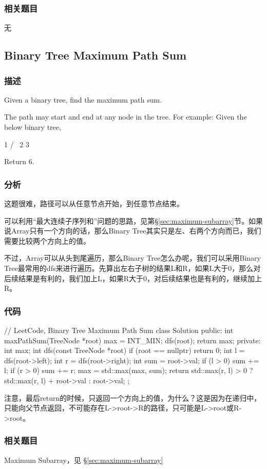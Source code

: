 \subsubsection{相关题目}
\begindot
\item 无
\myenddot


\subsection{Binary Tree Maximum Path Sum}
\label{sec:binary-tree-maximum-path-sum}


\subsubsection{描述}
Given a binary tree, find the maximum path sum.

The path may start and end at any node in the tree.
For example:
Given the below binary tree,
\begin{Code}
  1
 / \
2   3
\end{Code}
Return $6$.


\subsubsection{分析}
这题很难，路径可以从任意节点开始，到任意节点结束。

可以利用“最大连续子序列和”问题的思路，见第\S \ref{sec:maximum-subarray}节。如果说Array只有一个方向的话，那么Binary Tree其实只是左、右两个方向而已，我们需要比较两个方向上的值。

不过，Array可以从头到尾遍历，那么Binary Tree怎么办呢，我们可以采用Binary Tree最常用的dfs来进行遍历。先算出左右子树的结果L和R，如果L大于0，那么对后续结果是有利的，我们加上L，如果R大于0，对后续结果也是有利的，继续加上R。

\subsubsection{代码}

\begin{Code}
// LeetCode, Binary Tree Maximum Path Sum
class Solution {
public:
    int maxPathSum(TreeNode *root) {
        max = INT_MIN;
        dfs(root);
        return max;
    }
private:
    int max;
    int dfs(const TreeNode *root) {
        if (root == nullptr) return 0;
        int l = dfs(root->left);
        int r = dfs(root->right);
        int sum = root->val;
        if (l > 0) sum += l;
        if (r > 0) sum += r;
        max = std::max(max, sum);
        return std::max(r, l) > 0 ? std::max(r, l) + root->val : root->val;
    }
};
\end{Code}

注意，最后return的时候，只返回一个方向上的值，为什么？这是因为在递归中，只能向父节点返回，不可能存在L->root->R的路径，只可能是L->root或R->root。


\subsubsection{相关题目}
\begindot
\item Maximum Subarray，见 \S \ref{sec:maximum-subarray}
\myenddot

